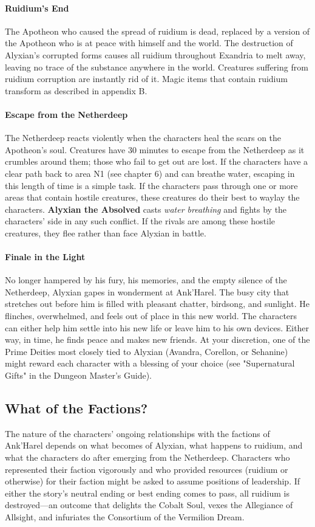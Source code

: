 \documentclass[10pt,a4,twoside,twocolumn,openany,nodeprecatedcode]{dndbook}
\begin{document}
\paragraph{Ruidium's End}
The Apotheon who caused the spread of ruidium is dead, replaced by a version of the Apotheon who is at peace with himself and the world. The destruction of Alyxian's corrupted forms causes all ruidium throughout Exandria to melt away, leaving no trace of the substance anywhere in the world. Creatures suffering from ruidium corruption are instantly rid of it. Magic items that contain ruidium transform as described in appendix B.
\paragraph{Escape from the Netherdeep}
The Netherdeep reacts violently when the characters heal the scars on the Apotheon's soul. Creatures have 30 minutes to escape from the Netherdeep as it crumbles around them; those who fail to get out are lost. If the characters have a clear path back to area N1 (see chapter 6) and can breathe water, escaping in this length of time is a simple task. If the characters pass through one or more areas that contain hostile creatures, these creatures do their best to waylay the characters. \textbf{Alyxian the Absolved} casts \textit{water breathing} and fights by the characters' side in any such conflict. If the rivals are among these hostile creatures, they flee rather than face Alyxian in battle.
\paragraph{Finale in the Light}
No longer hampered by his fury, his memories, and the empty silence of the Netherdeep, Alyxian gapes in wonderment at Ank'Harel. The busy city that stretches out before him is filled with pleasant chatter, birdsong, and sunlight. He flinches, overwhelmed, and feels out of place in this new world. The characters can either help him settle into his new life or leave him to his own devices. Either way, in time, he finds peace and makes new friends.
At your discretion, one of the Prime Deities most closely tied to Alyxian (Avandra, Corellon, or Sehanine) might reward each character with a blessing of your choice (see "Supernatural Gifts" in the Dungeon Master's Guide).
\subsection{What of the Factions?}
The nature of the characters' ongoing relationships with the factions of Ank'Harel depends on what becomes of Alyxian, what happens to ruidium, and what the characters do after emerging from the Netherdeep.
Characters who represented their faction vigorously and who provided resources (ruidium or otherwise) for their faction might be asked to assume positions of leadership. If either the story's neutral ending or best ending comes to pass, all ruidium is destroyed—an outcome that delights the Cobalt Soul, vexes the Allegiance of Allsight, and infuriates the Consortium of the Vermilion Dream.
\end{document}
